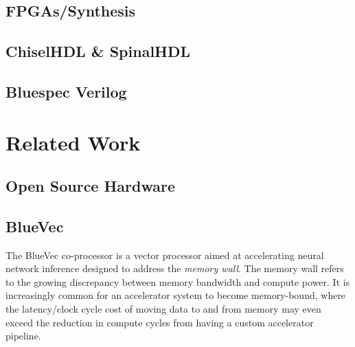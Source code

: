 \documentclass[a4paper,9pt]{report}
\begin{document}




\section{FPGAs/Synthesis}



\section{ChiselHDL \& SpinalHDL}

\section{Bluespec Verilog}

\chapter{Related Work} 
\section{Open Source Hardware}

\section{BlueVec}
The BlueVec co-processor is a vector processor aimed at accelerating neural
network inference designed to address the \emph{memory wall}. The memory wall
refers to the growing discrepancy between memory bandwidth and compute power. It
is increasingly common for an accelerator system to become memory-bound, where
the latency/clock cycle cost of moving data to and from memory may even exceed
the reduction in compute cycles from having a custom accelerator pipeline.
\end{document}
